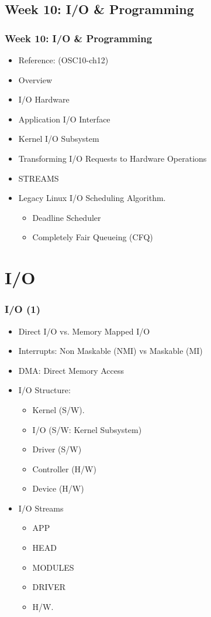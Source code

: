 \documentclass[aspectratio=169, xcolor=table, notheorems, hyperref={pdfpagelabels=false}]{beamer}
\begin{document}
\begin{frame}
\section{Week 10: I/O \& Programming}
\frametitle{Week 10: I/O \& Programming}
\begin{itemize}
\item Reference: (OSC10-ch12)
\item Overview
\item I/O Hardware
\item Application I/O Interface
\item Kernel I/O Subsystem
\item Transforming I/O Requests to Hardware Operations
\item STREAMS
\item Legacy Linux I/O Scheduling Algorithm.
\begin{itemize}
\item Deadline Scheduler
\item Completely Fair Queueing (CFQ)
\end{itemize}
\end{itemize}
\end{frame}

\section{I/O}
\begin{frame}
\frametitle{I/O (1)}
\begin{itemize}
\item Direct I/O vs. Memory Mapped I/O
\item Interrupts: Non Maskable (NMI) vs Maskable (MI)
\item DMA: Direct Memory Access
\item I/O Structure:
\begin{itemize}
\item Kernel (S/W).
\item I/O (S/W: Kernel Subsystem)
\item Driver (S/W)
\item Controller (H/W)
\item Device (H/W)
\end{itemize}
\item I/O Streams
\begin{itemize}
\item APP
\item HEAD
\item MODULES
\item DRIVER
\item H/W.
\end{itemize}
\end{itemize}
\end{frame}
\end{document}
